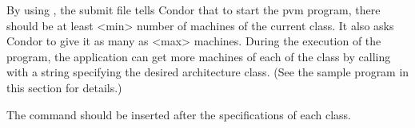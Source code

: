 By using , the submit file tells
Condor that to start the pvm program, there should be at least <min>
number of machines of the current class.  It also asks Condor to give
it as many as <max> machines.  During the execution of the program,
the application can get more machines of each of the class by calling
 with a string specifying the desired architecture
class.  (See the sample program in this section for details.)

The  command should be inserted after the specifications of
each class.





